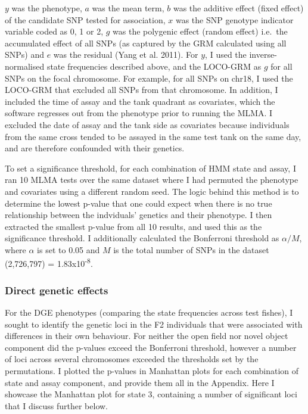\documentclass[
]{book}
\begin{document}
\(y\) was the phenotype, \(a\) was the mean term, \(b\) was the additive effect (fixed effect) of the candidate SNP tested for association, \(x\) was the SNP genotype indicator variable coded as 0, 1 or 2, \(g\) was the polygenic effect (random effect) i.e.~the accumulated effect of all SNPs (as captured by the GRM calculated using all SNPs) and \(e\) was the residual (Yang et al. 2011). For \(y\), I used the inverse-normalised state frequencies described above, and the LOCO-GRM as \(g\) for all SNPs on the focal chromosome. For example, for all SNPs on chr18, I used the LOCO-GRM that excluded all SNPs from that chromosome. In addition, I included the time of assay and the tank quadrant as covariates, which the software regresses out from the phenotype prior to running the MLMA. I excluded the date of assay and the tank side as covariates because individuals from the same cross tended to be assayed in the same test tank on the same day, and are therefore confounded with their genetics.

To set a significance threshold, for each combination of HMM state and assay, I ran 10 MLMA tests over the same dataset where I had permuted the phenotype and covariates using a different random seed. The logic behind this method is to determine the lowest p-value that one could expect when there is no true relationship between the indviduals' genetics and their phenotype. I then extracted the smallest p-value from all 10 results, and used this as the significance threshold. I additionally calculated the Bonferroni threshold as \(\alpha / M\), where \(\alpha\) is set to 0.05 and \(M\) is the total number of SNPs in the dataset (2,726,797) = 1.83x10\textsuperscript{-8}.

\hypertarget{direct-genetic-effects-2}{%
\subsubsection{Direct genetic effects}\label{direct-genetic-effects-2}}

For the DGE phenotypes (comparing the state frequencies across test fishes), I sought to identify the genetic loci in the F2 individuals that were associated with differences in their own behaviour. For neither the open field nor novel object component did the p-values exceed the Bonferroni threshold, however a number of loci across several chromosomes exceeded the thresholds set by the permutations. I plotted the p-values in Manhattan plots for each combination of state and assay component, and provide them all in the Appendix. Here I showcase the Manhattan plot for state 3, containing a number of significant loci that I discuss further below.
\end{document}
